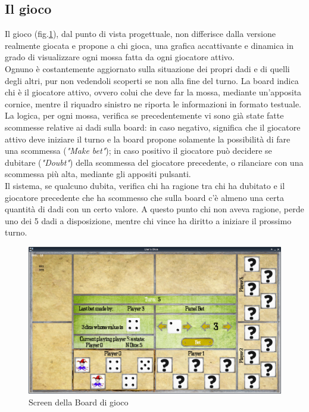 \documentclass{llncs}
\begin{document}
	\subsection{Il gioco}
	Il gioco (fig.\ref{board}), dal punto di vista progettuale, non differisce dalla versione realmente giocata e propone a chi gioca, una grafica accattivante e dinamica in grado di visualizzare ogni mossa fatta da ogni giocatore attivo.\\
	Ognuno è costantemente aggiornato sulla situazione dei propri dadi e di quelli degli altri, pur non vedendoli scoperti se non alla fine del turno. La board indica chi è il giocatore attivo, ovvero colui che deve far la mossa, mediante un'apposita cornice, mentre il riquadro sinistro ne riporta le informazioni in formato testuale.\\
	La logica, per ogni mossa, verifica se precedentemente vi sono già state fatte scommesse relative ai dadi sulla board: in caso negativo, significa che il giocatore attivo deve iniziare il turno e la board propone solamente la possibilità di fare una scommessa (\textit{"Make bet"}); in caso positivo il giocatore può decidere se dubitare (\textit{"Doubt"}) della scommessa del giocatore precedente, o rilanciare con una scommessa più alta, mediante gli appositi pulsanti.\\
	Il sistema, se qualcuno dubita, verifica chi ha ragione tra chi ha dubitato e il giocatore precedente che ha scommesso che sulla board c'è almeno una certa quantità di dadi con un certo valore. A questo punto chi non aveva ragione, perde uno dei 5 dadi a disposizione, mentre chi vince ha diritto a iniziare il prossimo turno.\\
	
			\begin{figure}[H]
				\includegraphics[scale=0.34]{img/BoardExample.png}
				\caption{\small{Screen della Board di gioco}}
				\label{board}
			\end{figure}
	
\end{document}
